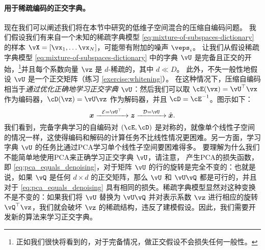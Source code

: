 \documentclass[../../book-main_zh.tex]{subfiles}
\begin{document}

\paragraph{用于稀疏编码的正交字典。}
现在我们可以阐述我们将在本节中研究的低维子空间混合的压缩自编码问题。
我们假设我们有来自一个未知的稀疏字典模型 \eqref{eq:mixture-of-subspaces-dictionary} 的样本 $\vX = [\vx_1, \dots \vx_N]$，可能带有附加的噪声 $\veps_i$。
让我们从假设稀疏字典模型 \eqref{eq:mixture-of-subspaces-dictionary} 中的字典 $\vU$ 是完备且正交的开始，\footnote{正如我们很快将看到的，对于完备情况，做正交假设不会损失任何一般性。}并且每个系数向量 $\vz$ 是 $d$-稀疏的，其中 $d \ll D$。
此外，不失一般性地假设 $\vU$ 是一个正交矩阵（练习 \ref{exercise:whitening}）。
在这种情况下，压缩自编码相当于\textit{通过优化正确地学习正交字典 $\vU$}：然后我们可以取 $\cE(\vx) = \vU^\top \vx$ 作为编码器，$\cD(\vz) = \vU \vz$ 作为解码器，并且 $\cD = \cE^{-1}$。图示如下：
\begin{equation}
\x \xrightarrow{\hspace{2mm} \mathcal{E} = \vU^\top \hspace{2mm}}  \z \xrightarrow{\hspace{2mm} \mathcal{D} = \vU \hspace{2mm}}   \hat{\x}.  
\label{eqn:autoencoding-DL}
\end{equation}    
我们看到，完备字典学习的自编码对 $(\cE, \cD)$ 是对称的，就像单个线性子空间的情况一样，这使得编码和解码的计算任务不比线性情况更困难。另一方面，学习字典 $\vU$ 的任务比通过PCA学习单个线性子空间要困难得多。
要理解为什么我们不能简单地使用PCA来正确学习正交字典 $\vU$，请注意，
产生PCA的损失函数，即 \eqref{eq:pca_equals_denoising}，对于矩阵 $\vU$ 的行的旋转是完全不变的：也就是说，如果 $\vQ$ 是任何 $d \times d$ 的正交矩阵，那么 $\vU$ 和 $\vU \vQ$ 都是可行的，并且对于 \eqref{eq:pca_equals_denoising} 具有相同的损失。稀疏字典模型显然对这种变换不是不变的：如果我们将 $\vU$ 替换为 $\vU \vQ$ 并对表示系数 $\vz$ 进行相应的旋转 $\vQ^\top \vz$，我们就会破坏 $\vz$ 的稀疏结构，违反了建模假设。因此，我们需要开发新的算法来学习正交字典。
\end{document}
